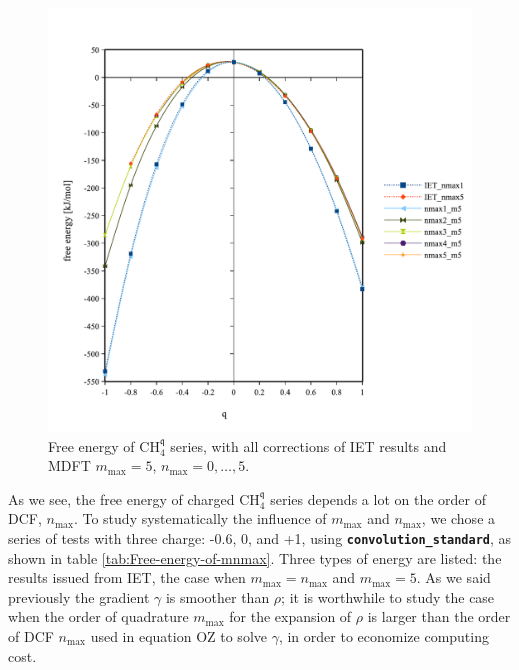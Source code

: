 \begin{figure}[!th]
\begin{centering}
\includegraphics[bb=0bp 20bp 510bp 490bp,width=0.9\columnwidth]{_figure/results/ch4_inter_nmax}
\par\end{centering}
\caption[Free energy of $\mathrm{C}\mathrm{H}_{4}^{\mathfrak{q}}$ series (with
corrections) for different $n_{\max}$ ($m_{\max}=5$)]{Free energy of $\mathrm{C}\mathrm{H}_{4}^{\mathfrak{q}}$ series,
with all corrections of \acs{IET} results and \acs{MDFT} $m_{\max}=5$,
$n_{\max}=0,\ldots,5$.\label{fig:Comparison-to-IET,with-corr-nmax}}
\end{figure}

As we see, the free energy of charged $\mathrm{C}\mathrm{H}_{4}^{\mathfrak{q}}$
series depends a lot on the order of \acs{DCF}, $n_{\max}$. To study
systematically the influence of $m_{\max}$ and $n_{\max}$, we chose
a series of tests with three charge: -0.6, 0, and +1, using \texttt{\textbf{convolution\_standard}},
as shown in table \ref{tab:Free-energy-of-mnmax}. Three types of
energy are listed: the results issued from \acs{IET}, the case when
$m_{\max}=n_{\max}$ and $m_{\max}=5$. As we said previously the
gradient $\gamma$ is smoother than $\rho$; it is worthwhile to study
the case when the order of quadrature $m_{\max}$ for the expansion
of $\rho$ is larger than the order of \acs{DCF} $n_{\max}$ used
in equation \acs{OZ} to solve $\gamma$, in order to economize computing
cost.

